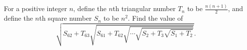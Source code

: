 For a positive integer $n$, define the $n$th triangular number $T_n$ to be $\frac{n(n+1)}{2}$, and define the $n$th square number $S_n$ to be $n^2$. Find the value of \[\sqrt{S_{62}+T_{63}\sqrt{S_{61}+T_{62}\sqrt{\cdots \sqrt{S_2+T_3\sqrt{S_1+T_2}}}}}.\]

